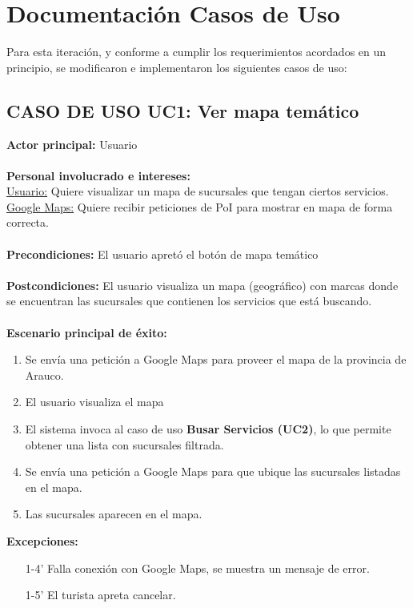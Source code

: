 \documentclass[12pt]{article}
\begin{document}
\section{Documentación Casos de Uso}
Para esta iteración, y conforme a cumplir los requerimientos acordados en un principio, se modificaron e implementaron los siguientes casos de uso:

\subsection{\textbf{CASO DE USO UC1:} Ver mapa temático }
\textbf{Actor principal:} Usuario\\
\\
\textbf{Personal involucrado e intereses: }\\
\underline{Usuario:} Quiere visualizar un mapa de sucursales que tengan ciertos servicios.\\\underline{Google Maps:} Quiere recibir peticiones de PoI para mostrar en mapa de forma correcta.\\
\\
\textbf{Precondiciones:} El usuario apretó el botón de mapa temático\\
\\
\textbf{Postcondiciones:} El usuario visualiza un mapa (geográfico) con marcas donde se encuentran las sucursales que contienen los servicios que está buscando.\\
\\
\textbf{Escenario principal de éxito:}
\begin{enumerate}
\item Se envía una petición a Google Maps para proveer el mapa de la provincia de Arauco.
\item El usuario visualiza el mapa
\item El sistema invoca al caso de uso \textbf{Busar Servicios (UC2)}, lo que permite obtener una lista con sucursales filtrada.
\item Se envía una petición a Google Maps para que ubique las sucursales listadas en el mapa.
\item Las sucursales aparecen en el mapa.
\end{enumerate}
\textbf{Excepciones:}
\begin{enumerate}
\item[1-4'] Falla conexión con Google Maps, se muestra un mensaje de error.
\item[1-5'] El turista apreta cancelar.
\end{enumerate}
\newpage
\end{document}
